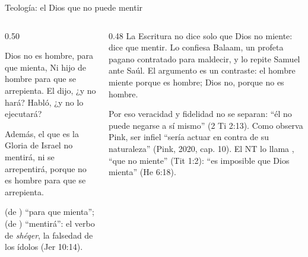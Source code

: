 \begin{frame}{Teología: el Dios que no puede mentir}
\begin{columns}[t,onlytextwidth]
\begin{column}{0.50\textwidth}
\begin{cita}Dios no es hombre, para que mienta, Ni hijo de hombre para que se arrepienta. El dijo, ¿y no hará? Habló, ¿y no lo ejecutará?\end{cita}
\begin{cita}Además, el que es la Gloria de Israel no mentirá, ni se arrepentirá, porque no es hombre para que se arrepienta.\end{cita}
\scriptsize {} (de ) ``para que mienta'';  (de ) ``mentirá'': el verbo de \emph{shéqer}, la falsedad de los ídolos (Jer 10:14).
\end{column}
\begin{column}{0.48\textwidth}\small
La Escritura no dice solo que Dios no miente: dice que  mentir. Lo confiesa Balaam, un profeta pagano contratado para maldecir, y lo repite Samuel ante Saúl. El argumento es un contraste: el hombre miente porque es hombre; Dios no, porque no es hombre.\par\medskip
Por eso veracidad y fidelidad no se separan: ``él no puede negarse a sí mismo'' (2 Ti 2:13). Como observa Pink, ser infiel ``sería actuar en contra de su naturaleza'' (Pink, 2020, cap. 10). El NT lo llama , ``que no miente'' (Tit 1:2): ``es imposible que Dios mienta'' (He 6:18).
\end{column}
\end{columns}
\end{frame}

